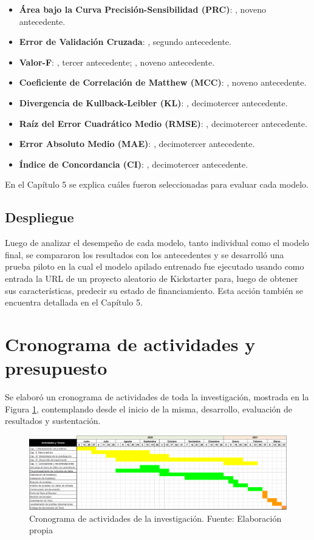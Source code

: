 \begin{itemize}
	\item \textbf{Área bajo la Curva Precisión-Sensibilidad (PRC)}: \citeauthor{pr_kaur2017socmedcrowd}, noveno antecedente.
	\item \textbf{Error de Validación Cruzada}: \citeauthor{pr_mitra2014phrases}, segundo antecedente.
	\item \textbf{Valor-F}: \citeauthor{pr_zhou2015projectdesc}, tercer antecedente; \citeauthor{pr_kaur2017socmedcrowd}, noveno antecedente.
	\item \textbf{Coeficiente de Correlación de Matthew (MCC)}: \citeauthor{pr_kaur2017socmedcrowd}, noveno antecedente.
	\item \textbf{Divergencia de Kullback-Leibler (KL)}: \citeauthor{pr_jin2019dayssuccess}, decimotercer antecedente.
	\item \textbf{Raíz del Error Cuadrático Medio (RMSE)}: \citeauthor{pr_jin2019dayssuccess}, decimotercer antecedente.
	\item \textbf{Error Absoluto Medio (MAE)}: \citeauthor{pr_jin2019dayssuccess}, decimotercer antecedente.
	\item \textbf{Índice de Concordancia (CI)}: \citeauthor{pr_jin2019dayssuccess}, decimotercer antecedente.
\end{itemize}

En el Capítulo 5 se explica cuáles fueron seleccionadas para evaluar cada modelo.

\subsection{Despliegue}
Luego de analizar el desempeño de cada modelo, tanto individual como el modelo final, se compararon los resultados con los antecedentes y se desarrolló una prueba piloto en la cual el modelo apilado entrenado fue ejecutado usando como entrada la URL de un proyecto aleatorio de Kickstarter para, luego de obtener sus características, predecir su estado de financiamiento. Esta acción también se encuentra detallada en el Capítulo 5.

\section{Cronograma de actividades y presupuesto}
Se elaboró un cronograma de actividades de toda la investigación, mostrada en la Figura \ref{3:fig5}, contemplando desde el inicio de la misma, desarrollo, evaluación de resultados y sustentación.
\begin{figure}[h]
	\begin{center}
		\includegraphics[width=1.1\textwidth]{3/figures/cronograma.png}
		\caption{Cronograma de actividades de la investigación. Fuente: Elaboración propia}
		\label{3:fig5}
	\end{center}
\end{figure}